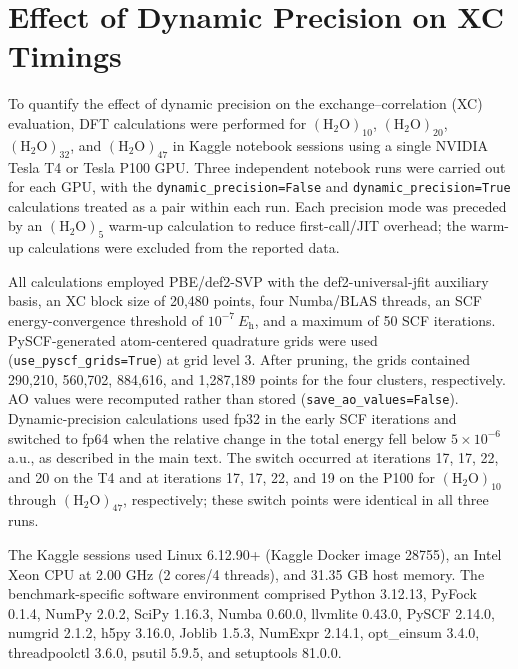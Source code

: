 
\section{Effect of Dynamic Precision on XC Timings}
\label{sec:dynamic_precision_xc}

To quantify the effect of dynamic precision on the exchange--correlation (XC)
evaluation, DFT calculations were performed for
$(\mathrm{H_2O})_{10}$, $(\mathrm{H_2O})_{20}$,
$(\mathrm{H_2O})_{32}$, and $(\mathrm{H_2O})_{47}$ in Kaggle notebook
sessions using a single NVIDIA Tesla T4 or Tesla P100 GPU.  Three independent
notebook runs were carried out for each GPU, with the
\texttt{dynamic\_precision=False} and \texttt{dynamic\_precision=True}
calculations treated as a pair within each run.  Each precision mode was
preceded by an $(\mathrm{H_2O})_{5}$ warm-up calculation to reduce
first-call/JIT overhead; the warm-up calculations were excluded from the
reported data.

All calculations employed PBE/def2-SVP with the def2-universal-jfit auxiliary
basis, an XC block size of 20,480 points, four Numba/BLAS threads, an SCF
energy-convergence threshold of $10^{-7}\ E_{\mathrm h}$, and a maximum of 50
SCF iterations.  PySCF-generated atom-centered quadrature grids were used
(\texttt{use\_pyscf\_grids=True}) at grid level 3.  After pruning, the grids
contained 290,210, 560,702, 884,616, and 1,287,189 points for the four clusters,
respectively.  AO values were recomputed rather than stored
(\texttt{save\_ao\_values=False}).  Dynamic-precision calculations used fp32
in the early SCF iterations and switched to fp64 when the relative change in
the total energy fell below $5\times10^{-6}$ a.u., as described in the main
text.  The switch occurred at iterations 17, 17, 22, and 20 on the T4 and at
iterations 17, 17, 22, and 19 on the P100 for
$(\mathrm{H_2O})_{10}$ through $(\mathrm{H_2O})_{47}$, respectively; these
switch points were identical in all three runs.

The Kaggle sessions used Linux 6.12.90+ (Kaggle Docker image 28755), an
Intel Xeon CPU at 2.00 GHz (2 cores/4 threads), and 31.35 GB host memory.
The benchmark-specific software environment comprised Python 3.12.13,
PyFock 0.1.4, NumPy 2.0.2, SciPy 1.16.3, Numba 0.60.0, llvmlite 0.43.0,
PySCF 2.14.0, numgrid 2.1.2, h5py 3.16.0, Joblib 1.5.3, NumExpr 2.14.1,
opt\_einsum 3.4.0, threadpoolctl 3.6.0, psutil 5.9.5, and
setuptools 81.0.0.

